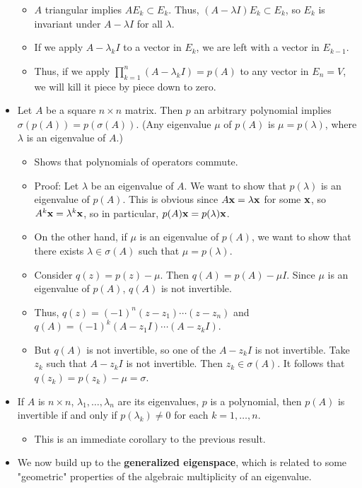 \documentclass[../../notes.tex]{subfiles}
\begin{document}
\begin{itemize}
\begin{itemize}
        \item $A$ triangular implies $AE_k\subset E_k$. Thus, $(A-\lambda I)E_k\subset E_k$, so $E_k$ is invariant under $A-\lambda I$ for all $\lambda$.
        \item If we apply $A-\lambda_kI$ to a vector in $E_k$, we are left with a vector in $E_{k-1}$.
        \item Thus, if we apply $\prod_{k=1}^n(A-\lambda_kI)=p(A)$ to any vector in $E_n=V$, we will kill it piece by piece down to zero.
    \end{itemize}
    \item Let $A$ be a square $n\times n$ matrix. Then $p$ an arbitrary polynomial implies $\sigma(p(A))=p(\sigma(A))$. (Any eigenvalue $\mu$ of $p(A)$ is $\mu=p(\lambda)$, where $\lambda$ is an eigenvalue of $A$.)
    \begin{itemize}
        \item Shows that polynomials of operators commute.
        \item Proof: Let $\lambda$ be an eigenvalue of $A$. We want to show that $p(\lambda)$ is an eigenvalue of $p(A)$. This is obvious since $A\mathbf{x}=\lambda\mathbf{x}$ for some $\mathbf{x}$, so $A^k\mathbf{x}=\lambda^k\mathbf{x}$, so in particular, $p(A)\mathbf{x}=p(\lambda)\mathbf{x}$.
        \item On the other hand, if $\mu$ is an eigenvalue of $p(A)$, we want to show that there exists $\lambda\in\sigma(A)$ such that $\mu=p(\lambda)$.
        \item Consider $q(z)=p(z)-\mu$. Then $q(A)=p(A)-\mu I$. Since $\mu$ is an eigenvalue of $p(A)$, $q(A)$ is not invertible.
        \item Thus, $q(z)=(-1)^n(z-z_1)\cdots(z-z_n)$ and $q(A)=(-1)^k(A-z_1I)\cdots(A-z_kI)$.
        \item But $q(A)$ is not invertible, so one of the $A-z_kI$ is not invertible. Take $z_k$ such that $A-z_kI$ is not invertible. Then $z_k\in\sigma(A)$. It follows that $q(z_k)=p(z_k)-\mu=\sigma$.
    \end{itemize}
    \item If $A$ is $n\times n$, $\lambda_1,\dots,\lambda_n$ are its eigenvalues, $p$ is a polynomial, then $p(A)$ is invertible if and only if $p(\lambda_k)\neq 0$ for each $k=1,\dots,n$.
    \begin{itemize}
        \item This is an immediate corollary to the previous result.
    \end{itemize}
    \item We now build up to the \textbf{generalized eigenspace}, which is related to some "geometric" properties of the algebraic multiplicity of an eigenvalue.

\end{itemize}
\end{document}
